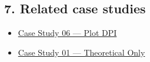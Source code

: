 \documentclass[
  11pt,
]{article}
\providecommand{\tightlist}{
  \setlength{\itemsep}{0pt}\setlength{\parskip}{0pt}}
\begin{document}
\hypertarget{7-related-case-studies}{
\subsection{7. Related case studies}\label{7-related-case-studies}}

\begin{itemize}
\tightlist
\item
  \href{https://github.com/pinarsyt/overlap-calculator/blob/main/case_studies/06_plot_dpi/README.md}{Case
  Study 06 --- Plot DPI}
\item
  \href{https://github.com/pinarsyt/overlap-calculator/blob/main/case_studies/01_theoretical_only/README.md}{Case
  Study 01 --- Theoretical Only}
\end{itemize}
\end{document}

